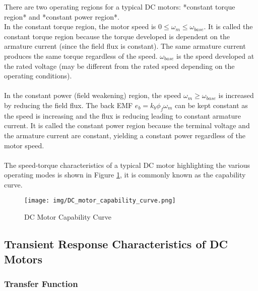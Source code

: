 \documentclass[a4paper]{article}
\begin{document}
There are two operating regions for a typical DC motors: *constant torque region* and *constant power region*. \\

In the constant torque region, the motor speed is $0 \le \omega_{m} \le \omega_{base}$. 
It is called the constant torque region because the torque developed is dependent on the armature current (since the field flux is constant). 
The same armature current produces the same torque regardless of the speed. 
$\omega_{base}$ is the speed developed at the rated voltage (may be different from the rated speed depending on the operating conditions).\\
\\
In the constant power (field weakening) region, the speed  $\omega_{m} \ge \omega_{base}$ is increased by reducing the field flux.
The back EMF $e_{b}= k_{b} \phi_{f} \omega_{m} $  can be kept constant as the speed is increasing and the flux is reducing leading to constant armature current.
It is called the constant power region because the terminal voltage and the armature current are constant, yielding a constant power regardless of the motor speed.\\
\\
The speed-torque characteristics of a typical DC motor highlighting the various operating modes is shown in Figure 
\ref{fig:DC_motor_cap}, it is commonly known as the capability curve.

\begin{figure}
        \centering
        \texttt{[image: img/DC\_motor\_capability\_curve.png]}
        \caption{DC Motor Capability Curve \cite{kim17}}
        \label{fig:DC_motor_cap}
\end{figure}


\subsection{Transient Response Characteristics of DC Motors}

\subsubsection{Transfer Function}
\end{document}
